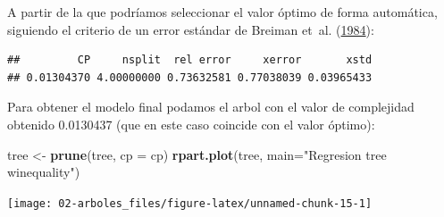 \documentclass[
  spanish,
]{book}
\newenvironment{Shaded}{\begin{snugshade}}{\end{snugshade}}
\newcommand{\CommentTok}[1]{\textcolor[rgb]{0.56,0.35,0.01}{\textit{#1}}}
\newcommand{\DataTypeTok}[1]{\textcolor[rgb]{0.13,0.29,0.53}{#1}}
\newcommand{\KeywordTok}[1]{\textcolor[rgb]{0.13,0.29,0.53}{\textbf{#1}}}
\newcommand{\NormalTok}[1]{#1}
\newcommand{\OperatorTok}[1]{\textcolor[rgb]{0.81,0.36,0.00}{\textbf{#1}}}
\newcommand{\StringTok}[1]{\textcolor[rgb]{0.31,0.60,0.02}{#1}}
\theoremstyle{break}
\theoremstyle{definition}
\theoremstyle{definition}
\theoremstyle{definition}
\theoremstyle{remark}
\begin{document}
A partir de la que podríamos seleccionar el valor óptimo de forma automática,
siguiendo el criterio de un error estándar de Breiman et~al. (\protect\hyperlink{ref-breiman1984classification}{1984}):

\begin{Shaded}
\end{Shaded}

\begin{verbatim}
##         CP     nsplit  rel error     xerror       xstd 
## 0.01304370 4.00000000 0.73632581 0.77038039 0.03965433
\end{verbatim}

\begin{Shaded}
\end{Shaded}

Para obtener el modelo final podamos el arbol con el valor de complejidad obtenido 0.0130437 (que en este caso coincide con el valor óptimo):

\begin{Shaded}
\begin{Highlighting}[]
\NormalTok{tree <-}\StringTok{ }\KeywordTok{prune}\NormalTok{(tree, }\DataTypeTok{cp =}\NormalTok{ cp)}
\KeywordTok{rpart.plot}\NormalTok{(tree, }\DataTypeTok{main=}\StringTok{"Regresion tree winequality"}\NormalTok{) }
\end{Highlighting}
\end{Shaded}

\begin{center}\texttt{[image: 02-arboles\_files/figure-latex/unnamed-chunk-15-1]} \end{center}
\end{document}
